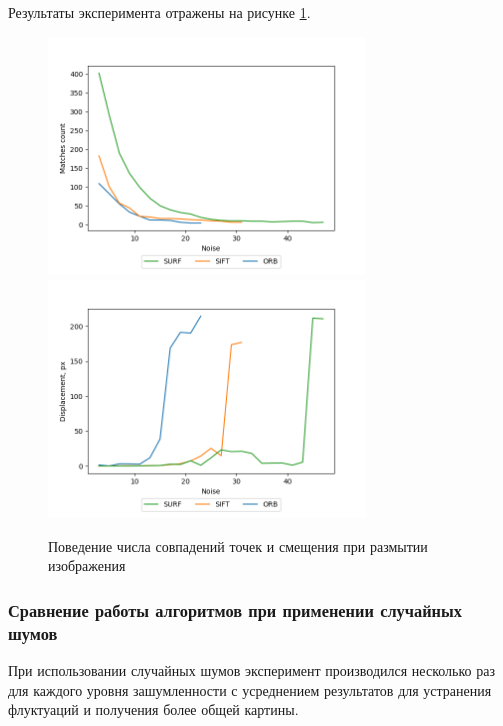 {{{{   			Результаты эксперимента отражены на рисунке \ref{blur_mch_disp}.
   			
   			\begin{figure}[H]
   				\centering                             
   				\includegraphics[width=0.75\textwidth,keepaspectratio]{ex1/Rand_noises_matches.png}   
   				\includegraphics[width=0.75\textwidth,keepaspectratio]{ex1/Rand_noises_displacement.png}       
   				\centering\caption{ Поведение числа совпадений точек и смещения при размытии изображения }
   				\label{blur_mch_disp}                           
   			\end{figure}    
   			
   			\newpage
   			\subsubsection{ Сравнение работы алгоритмов при применении случайных шумов } При использовании случайных шумов эксперимент производился несколько раз для каждого уровня зашумленности с усреднением результатов для устранения флуктуаций и получения более общей картины. 
   			
}}}}
